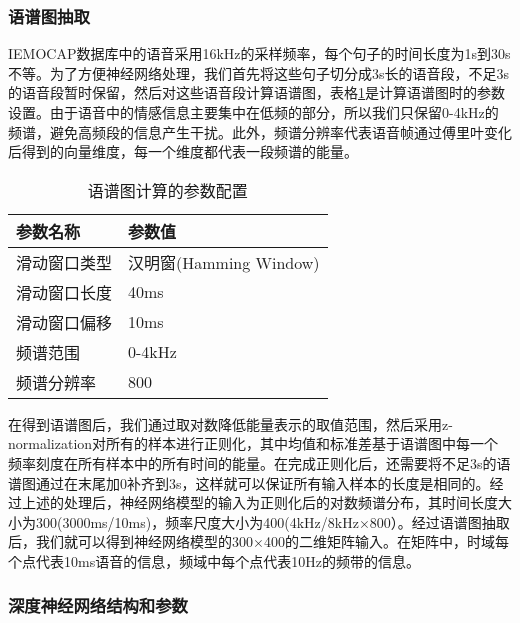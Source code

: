 \subsubsection{语谱图抽取}
\label{ssec:end2end_spectrogram_extract}

IEMOCAP数据库中的语音采用16kHz的采样频率，每个句子的时间长度为1s到30s不等。为了方便神经网络处理，我们首先将这些句子切分成3s长的语音段，不足3s的语音段暂时保留，然后对这些语音段计算语谱图，表格\ref{tab:end2end_spectrogram_setup}是计算语谱图时的参数设置。由于语音中的情感信息主要集中在低频的部分，所以我们只保留0-4kHz的频谱，避免高频段的信息产生干扰。此外，频谱分辨率代表语音帧通过傅里叶变化后得到的向量维度，每一个维度都代表一段频谱的能量。

\begin{table}[htb]
\centering
\begin{minipage}[t]{0.8\linewidth} %
\caption{语谱图计算的参数配置}
\label{tab:end2end_spectrogram_setup}
    \begin{tabularx}{\linewidth}{X<{\centering} X<{\centering}}
        \toprule[1.5pt]
        参数名称 & 参数值 \\
        \midrule[1pt]
        滑动窗口类型 & 汉明窗(Hamming Window) \\
        滑动窗口长度 & 40ms \\
        滑动窗口偏移 & 10ms \\
        频谱范围 & 0-4kHz \\
        频谱分辨率 & 800 \\
        \bottomrule[1.5pt]
    \end{tabularx}
\end{minipage}
\end{table}

在得到语谱图后，我们通过取对数降低能量表示的取值范围，然后采用z-normalization对所有的样本进行正则化，其中均值和标准差基于语谱图中每一个频率刻度在所有样本中的所有时间的能量。在完成正则化后，还需要将不足3s的语谱图通过在末尾加0补齐到3s，这样就可以保证所有输入样本的长度是相同的。经过上述的处理后，神经网络模型的输入为正则化后的对数频谱分布，其时间长度大小为300(3000ms/10ms)，频率尺度大小为400(4kHz/8kHz$\times$800）。经过语谱图抽取后，我们就可以得到神经网络模型的300$\times$400的二维矩阵输入。在矩阵中，时域每个点代表10ms语音的信息，频域中每个点代表10Hz的频带的信息。

\subsubsection{深度神经网络结构和参数}
\label{ssec:end2end_nn_topology}

